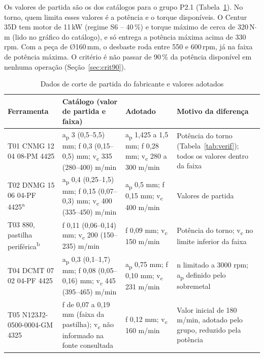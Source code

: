 Os valores de partida são os dos catálogos para o grupo P2.1 (Tabela~\ref{tab:catalogo}). No torno, quem limita esses valores é a potência e o torque disponíveis. O Centur 35D tem motor de 11\,kW (regime S6 -- 40\,\%) e torque máximo de cerca de 320\,N$\cdot$m (lido no gráfico do catálogo), e só entrega a potência máxima acima de 330\,rpm. Com a peça de Ø160\,mm, o desbaste roda entre 550 e 600\,rpm, já na faixa de potência máxima. O critério é não passar de 90\,\% da potência disponível em nenhuma operação (Seção~\ref{sec:crit90}).

\begin{table}[H]
\centering
\caption{Dados de corte de partida do fabricante e valores adotados}\label{tab:catalogo}
{\footnotesize\renewcommand{\arraystretch}{1.2}
\begin{tabular}{|>{\raggedright\arraybackslash}p{2.9cm}|>{\raggedright\arraybackslash}p{4.4cm}|>{\raggedright\arraybackslash}p{3.0cm}|>{\raggedright\arraybackslash}p{4.4cm}|}
\hline
\rowcolor{cinza} \textbf{Ferramenta} & \textbf{Catálogo (valor de partida e faixa)} & \textbf{Adotado} & \textbf{Motivo da diferença} \\ \hline
T01 CNMG 12 04 08-PM 4425 & a\textsubscript{p} 3 (0,5–5,5) mm; f 0,3 (0,15–0,5) mm; v\textsubscript{c} 335 (280–400) m/min & a\textsubscript{p} 1,425 a 1,5 mm; f 0,28 mm; v\textsubscript{c} 280 a 300 m/min & Potência do torno (Tabela~\ref{tab:verif}); todos os valores dentro da faixa \\ \hline
T02 DNMG 15 06 04-PF 4425\textsuperscript{a} & a\textsubscript{p} 0,4 (0,25–1,5) mm; f 0,15 (0,07–0,3) mm; v\textsubscript{c} 400 (335–450) m/min & a\textsubscript{p} 0,5 mm; f 0,15 mm; v\textsubscript{c} 400 m/min & Valores de partida \\ \hline
T03 880, pastilha periférica\textsuperscript{b} & f 0,11 (0,06–0,14) mm; v\textsubscript{c} 200 (150–235) m/min & f 0,09 mm; v\textsubscript{c} 150 m/min & Potência do torno; v\textsubscript{c} no limite inferior da faixa \\ \hline
T04 DCMT 07 02 04-PF 4425 & a\textsubscript{p} 0,3 (0,1–1,7) mm; f 0,08 (0,05–0,16) mm; v\textsubscript{c} 445 (395–465) m/min & a\textsubscript{p} 0,75 mm; f 0,10 mm; v\textsubscript{c} 231 m/min & n limitado a 3000 rpm; a\textsubscript{p} definido pelo sobremetal \\ \hline
T05 N123J2-0500-0004-GM 4325 & f de 0,07 a 0,19 mm (faixa da pastilha); v\textsubscript{c} não informado na fonte consultada & f 0,12 mm; v\textsubscript{c} 160 m/min & Valor inicial de 180 m/min, adotado pelo grupo, reduzido pela potência \\ \hline

\end{tabular}}
\end{table}
